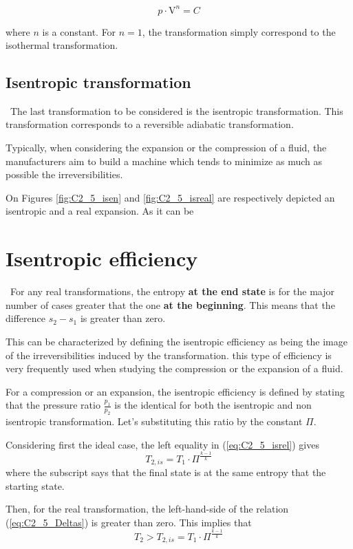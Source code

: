 \begin{equation}
  p\cdot \mathrm{V}^n = C \label{eq:C2_5_poly}
\end{equation}

where $n$ is a constant. For $n=1$, the transformation simply correspond to the isothermal transformation.

\subsection{Isentropic transformation}
\quad\ The last transformation to be considered is the isentropic transformation. This transformation corresponds to a reversible adiabatic transformation. 

Typically, when considering the expansion or the compression of a fluid, the manufacturers aim to build a machine which tends to minimize as much as possible the irreversibilities. 

On Figures \ref{fig:C2_5_isen} and \ref{fig:C2_5_isreal} are respectively depicted an isentropic and a real expansion. As it can be   
\section{Isentropic efficiency} \label{C2_5:Isen_eff}
\quad\, For any real transformations, the entropy \textbf{at the end state} is for the major number of cases greater that the one \textbf{at the beginning}. This means that the difference $s_2 - s_1$ is greater than zero.

This can be characterized by defining the isentropic efficiency as being the image of the irreversibilities induced by the transformation. this type of efficiency is very frequently used when studying the compression or the expansion of a fluid.

For a compression or an expansion, the isentropic efficiency is defined by stating that the pressure ratio $\frac{p_1}{p_2}$ is the identical for both the isentropic and non isentropic transformation. Let's substituting this ratio by the constant $\Pi$. 

Considering first the ideal case, the left equality in (\ref{eq:C2_5_isrel}) gives
\begin{equation}
T_{2,is} = T_1\cdot\Pi^\frac{k-1}{k}
\end{equation}
where the subscript says that the final state is at the same entropy that the starting state.

Then, for the real transformation, the left-hand-side of the relation (\ref{eq:C2_5_Deltas}) is greater than zero. This implies that
\begin{equation}
T_{2} > T_{2,is} = T_1\cdot\Pi^\frac{k-1}{k}
\end{equation}

